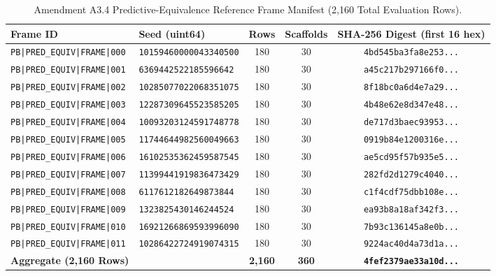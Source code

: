 \begin{table}[t]
\centering
\small
\caption{Amendment A3.4 Predictive-Equivalence Reference Frame Manifest (2,160 Total Evaluation Rows).}
\label{tab:reference_frames}
\begin{tabular}{llccc}
\toprule
Frame ID & Seed (uint64) & Rows & Scaffolds & SHA-256 Digest (first 16 hex) \\
\midrule
\texttt{PB|PRED_EQUIV|FRAME|000} & \texttt{10159460000043340500} & 180 & 30 & \texttt{4bd545ba3fa8e253...} \\
\texttt{PB|PRED_EQUIV|FRAME|001} & \texttt{6369442522185596642} & 180 & 30 & \texttt{a45c217b297166f0...} \\
\texttt{PB|PRED_EQUIV|FRAME|002} & \texttt{10285077022068351075} & 180 & 30 & \texttt{8f18bc0a6d4e7a29...} \\
\texttt{PB|PRED_EQUIV|FRAME|003} & \texttt{12287309645523585205} & 180 & 30 & \texttt{4b48e62e8d347e48...} \\
\texttt{PB|PRED_EQUIV|FRAME|004} & \texttt{10093203124591748778} & 180 & 30 & \texttt{de717d3baec93953...} \\
\texttt{PB|PRED_EQUIV|FRAME|005} & \texttt{11744644982560049663} & 180 & 30 & \texttt{0919b84e1200316e...} \\
\texttt{PB|PRED_EQUIV|FRAME|006} & \texttt{16102535362459587545} & 180 & 30 & \texttt{ae5cd95f57b935e5...} \\
\texttt{PB|PRED_EQUIV|FRAME|007} & \texttt{11399441919836473429} & 180 & 30 & \texttt{282fd2d1279c4040...} \\
\texttt{PB|PRED_EQUIV|FRAME|008} & \texttt{6117612182649873844} & 180 & 30 & \texttt{c1f4cdf75dbb108e...} \\
\texttt{PB|PRED_EQUIV|FRAME|009} & \texttt{1323825430146244524} & 180 & 30 & \texttt{ea93b8a18af342f3...} \\
\texttt{PB|PRED_EQUIV|FRAME|010} & \texttt{16921266869593996090} & 180 & 30 & \texttt{7b93c136145a8e0b...} \\
\texttt{PB|PRED_EQUIV|FRAME|011} & \texttt{10286422724919074315} & 180 & 30 & \texttt{9224ac40d4a73d1a...} \\
\midrule
\textbf{Aggregate (2,160 Rows)} & & \textbf{2,160} & \textbf{360} & \textbf{\texttt{4fef2379ae33a10d...}} \\
\bottomrule
\end{tabular}
\end{table}
